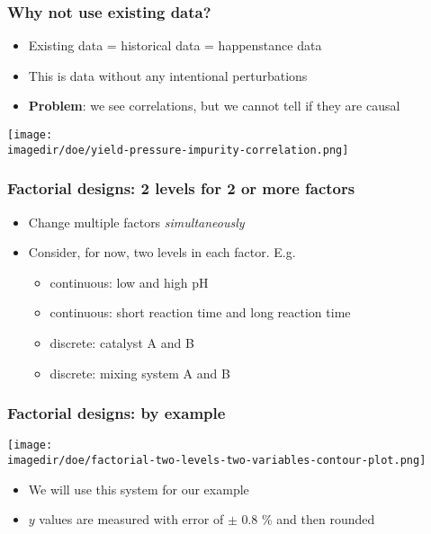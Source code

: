 \begin{frame}\frametitle{Why not use existing data?}
	\begin{itemize}
		\item	Existing data = historical data = happenstance data
		\item	This is data without any intentional perturbations
		\item	\textbf{Problem}: we see correlations, but we cannot tell if they are causal
	\end{itemize}
	\texttt{[image: \\imagedir/doe/yield-pressure-impurity-correlation.png]}
\end{frame}

\begin{frame}\frametitle{Factorial designs: 2 levels for 2 or more factors}
	\begin{itemize}
		\item	Change multiple factors \emph{simultaneously}
		\item	Consider, for now, two levels in each factor. E.g.
		\begin{itemize}
			\item	continuous: low and high pH
			\item	continuous: short reaction time and long reaction time
			\item	discrete: catalyst A and B
			\item	discrete: mixing system A and B
		\end{itemize}
	\end{itemize}
\end{frame}

\begin{frame}\frametitle{Factorial designs: by example}
	\begin{center}
		\texttt{[image: \\imagedir/doe/factorial-two-levels-two-variables-contour-plot.png]}
	\end{center}
	\begin{itemize}
		\item	We will use this system for our example
		\item	$y$ values are measured with error of $\pm$ 0.8 \% and then rounded
	\end{itemize}
\end{frame}

